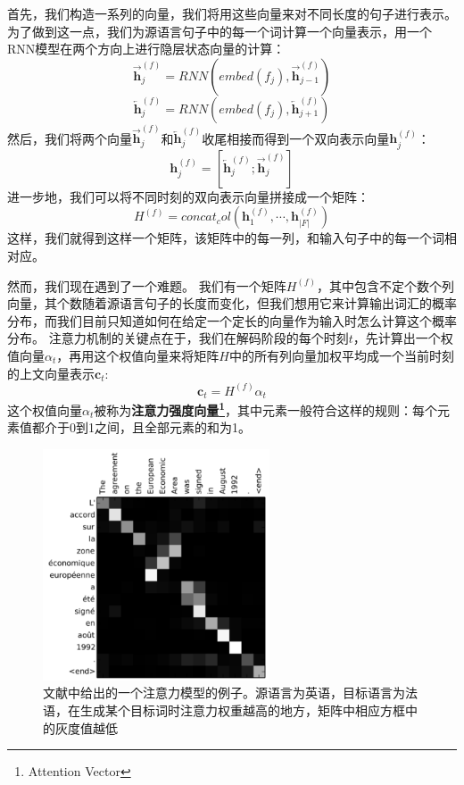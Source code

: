 \documentclass[10pt,a4paper]{ctexart}
\begin{document}
首先，我们构造一系列的向量，我们将用这些向量来对不同长度的句子进行表示。
为了做到这一点，我们为源语言句子中的每一个词计算一个向量表示，用一个RNN模型在两个方向上进行隐层状态向量的计算：
\[
 \overrightarrow{\textbf{h}}_j^{(f)} = RNN(embed(f_j),\overrightarrow{\textbf{h}}_{j-1}^{(f)})
\]
\[
 \overleftarrow{\textbf{h}}_j^{(f)} = RNN(embed(f_j),\overleftarrow{\textbf{h}}_{j+1}^{(f)})
\]
然后，我们将两个向量$\overrightarrow{\textbf{h}}_j^{(f)}$和$\overleftarrow{\textbf{h}}_j^{(f)}$收尾相接而得到一个双向表示向量$\textbf{h}_j^{(f)}$：
\[
 \textbf{h}_j^{(f)} = [\overleftarrow{\textbf{h}}_j^{(f)};\overrightarrow{\textbf{h}}_j^{(f)}]
\]
进一步地，我们可以将不同时刻的双向表示向量拼接成一个矩阵：
\[
 H^{(f)} = concat_col(\textbf{h}_1^{(f)},\cdots,\textbf{h}_{|F|}^{(f)})
\]
这样，我们就得到这样一个矩阵，该矩阵中的每一列，和输入句子中的每一个词相对应。

然而，我们现在遇到了一个难题。
我们有一个矩阵$H^{(f)}$，其中包含不定个数个列向量，其个数随着源语言句子的长度而变化，但我们想用它来计算输出词汇的概率分布，而我们目前只知道如何在给定一个定长的向量作为输入时怎么计算这个概率分布。
注意力机制的关键点在于，我们在解码阶段的每个时刻$t$，先计算出一个权值向量$\textbf{$\alpha$}_t$，再用这个权值向量来将矩阵$H$中的所有列向量加权平均成一个当前时刻的上文向量表示$\textbf{c}_t$:
\begin{equation}\label{eq:72}
 \textbf{c}_t = H^{(f)} \textbf{$\alpha$}_t
\end{equation}
这个权值向量$\textbf{$\alpha$}_t$被称为\textbf{注意力强度向量\footnote{Attention Vector}}，其中元素一般符合这样的规则：每个元素值都介于0到1之间，且全部元素的和为1。

\begin{figure}[H]
\centering
\includegraphics[width=0.6\textwidth]{fig27.png}
\caption{文献\cite{bahdanau2014neural}中给出的一个注意力模型的例子。源语言为英语，目标语言为法语，在生成某个目标词时注意力权重越高的地方，矩阵中相应方框中的灰度值越低}
\label{fig:27}
\end{figure}
\end{document}
